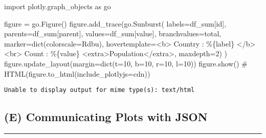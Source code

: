 \documentclass[
  letterpaper,
  DIV=11,
  numbers=noendperiod]{scrartcl}
\newenvironment{Shaded}{\begin{snugshade}}{\end{snugshade}}
\newcommand{\BuiltInTok}[1]{\textcolor[rgb]{0.00,0.23,0.31}{#1}}
\newcommand{\CommentTok}[1]{\textcolor[rgb]{0.37,0.37,0.37}{#1}}
\newcommand{\DecValTok}[1]{\textcolor[rgb]{0.68,0.00,0.00}{#1}}
\newcommand{\ImportTok}[1]{\textcolor[rgb]{0.00,0.46,0.62}{#1}}
\newcommand{\NormalTok}[1]{\textcolor[rgb]{0.00,0.23,0.31}{#1}}
\newcommand{\OperatorTok}[1]{\textcolor[rgb]{0.37,0.37,0.37}{#1}}
\newcommand{\SpecialCharTok}[1]{\textcolor[rgb]{0.37,0.37,0.37}{#1}}
\newcommand{\StringTok}[1]{\textcolor[rgb]{0.13,0.47,0.30}{#1}}
\begin{document}
\begin{Shaded}
\begin{Highlighting}[]
\ImportTok{import}\NormalTok{ plotly.graph\_objects }\ImportTok{as}\NormalTok{ go}

\NormalTok{figure }\OperatorTok{=}\NormalTok{ go.Figure()}
\NormalTok{figure.add\_trace(go.Sunburst(}
\NormalTok{        labels}\OperatorTok{=}\NormalTok{df\_sum[}\StringTok{\textquotesingle{}id\textquotesingle{}}\NormalTok{],}
\NormalTok{        parents}\OperatorTok{=}\NormalTok{df\_sum[}\StringTok{\textquotesingle{}parent\textquotesingle{}}\NormalTok{],}
\NormalTok{        values}\OperatorTok{=}\NormalTok{df\_sum[}\StringTok{\textquotesingle{}value\textquotesingle{}}\NormalTok{],}
\NormalTok{        branchvalues}\OperatorTok{=}\StringTok{\textquotesingle{}total\textquotesingle{}}\NormalTok{,}
\NormalTok{        marker}\OperatorTok{=}\BuiltInTok{dict}\NormalTok{(colorscale}\OperatorTok{=}\StringTok{\textquotesingle{}Rdbu\textquotesingle{}}\NormalTok{),}
\NormalTok{        hovertemplate}\OperatorTok{=}\StringTok{\textquotesingle{}\textless{}b\textgreater{} Country : \%}\SpecialCharTok{\{label\}}\StringTok{ \textless{}/b\textgreater{} \textless{}br\textgreater{} Count : \%}\SpecialCharTok{\{value\}}\StringTok{ \textless{}extra\textgreater{}Population\textless{}/extra\textgreater{}\textquotesingle{}}\NormalTok{,}
\NormalTok{        maxdepth}\OperatorTok{=}\DecValTok{2}\NormalTok{)}
\NormalTok{    )}
\NormalTok{figure.update\_layout(margin}\OperatorTok{=}\BuiltInTok{dict}\NormalTok{(t}\OperatorTok{=}\DecValTok{10}\NormalTok{, b}\OperatorTok{=}\DecValTok{10}\NormalTok{, r}\OperatorTok{=}\DecValTok{10}\NormalTok{, l}\OperatorTok{=}\DecValTok{10}\NormalTok{))}
\NormalTok{figure.show() }
\CommentTok{\# HTML(figure.to\_html(include\_plotlyjs=\textquotesingle{}cdn\textquotesingle{}))}
\end{Highlighting}
\end{Shaded}

\begin{verbatim}
Unable to display output for mime type(s): text/html
\end{verbatim}

\hypertarget{e-communicating-plots-with-json}{%
\subsection{(E) Communicating Plots with
JSON}\label{e-communicating-plots-with-json}}

\begin{center}\rule{0.5\linewidth}{0.5pt}\end{center}
\end{document}
